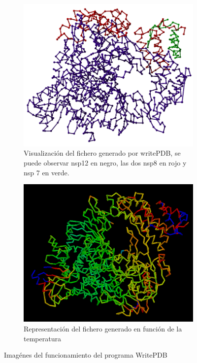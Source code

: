 \documentclass[a4paper,11pt]{report}
\begin{document}
\begin{figure}[h!]
	\begin{subfigure}[h]{0.45\textwidth}
		\includegraphics[width=\linewidth]{Figuras/Figura13}
		\caption{Visualización del fichero generado por writePDB, se puede observar nsp12 en negro, las dos nsp8 en rojo y nsp 7 en verde.}		
	\end{subfigure}
	\begin{subfigure}[h]{0.45\textwidth}
		\includegraphics[width=\linewidth]{Figuras/Figura21}
		\caption{Representación del fichero generado en función de la temperatura}		
	\end{subfigure}
	
 \caption{Imagénes del funcionamiento del programa WritePDB}
 \label{fig: write}	
\end{figure}
\end{document}
